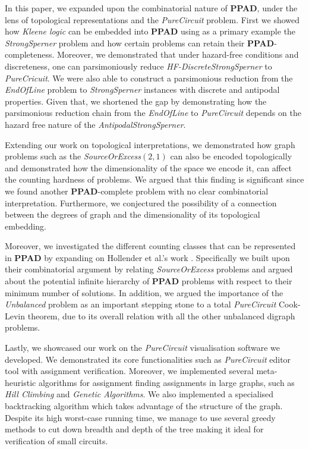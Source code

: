 In this paper, we expanded upon the combinatorial nature of
\textbf{PPAD}, under the lens of topological representations
and the \textit{PureCircuit} problem.
First we showed how \textit{Kleene logic} can be embedded
into \textbf{PPAD} using as a primary example the \textit{StrongSperner}
problem and how certain problems
can retain their \textbf{PPAD}-completeness. Moreover, we demonstrated that under hazard-free conditions
and discreteness,
one can parsimoniously reduce \textit{HF-DiscreteStrongSperner} to
\textit{PureCricuit}.
We were also able to construct a parsimonious reduction
from the \textit{EndOfLine} problem to  \textit{StrongSperner} instances
with discrete and antipodal properties.
Given that, we shortened the gap by demonstrating how the parsimonious reduction
chain from the \textit{EndOfLine} to \textit{PureCircuit}
depends on the hazard free nature of the \textit{AntipodalStrongSperner}.


Extending our work on topological interpretations, we demonstrated
how graph problems such as the \textit{SourceOrExcess}$(2,1)$ can also
be encoded topologically and demonstrated how
the dimensionality of the space we encode it, can affect the counting hardness
of problems. We argued that this finding is significant since
we found another \textbf{PPAD}-complete problem with no
clear combinatorial interpretation. Furthermore,
we conjectured the possibility of a connection between the degrees
of graph and the dimensionality of its topological embedding.



Moreover, we investigated the different counting classes that
can be represented in \textbf{PPAD} by expanding on Hollender et al.'s work \cite{hollender_ComplexityMultisourceVariants_2018}.
Specifically we built upon their combinatorial argument by
relating \textit{SourceOrExcess} problems and argued about the potential infinite hierarchy of \textbf{PPAD} problems with respect to their minimum number of solutions.
In addition, we argued the importance of the \textit{Unbalanced} problem as an
important stepping stone to a total \textit{PureCircuit} Cook-Levin theorem,
due to its overall relation with all the other unbalanced digraph problems.


Lastly, we showcased our work on the \textit{PureCircuit} visualisation software we developed.
We demonstrated its core functionalities such as \textit{PureCircuit} editor
tool with assignment verification. Moreover, we implemented several
meta-heuristic algorithms for assignment finding assignments in large graphs, such
as \textit{Hill Climbing} and \textit{Genetic Algorithms}.
We also implemented a specialised backtracking algorithm which takes advantage
of the structure of the graph. Despite its high worst-case running time,
we manage to use several greedy methods to cut down breadth and depth of the tree
making it ideal for verification of small circuits.